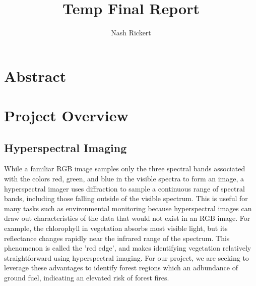 \documentclass{article}
\title{Temp Final Report}
\author{Nash Rickert}
\begin{document}
\maketitle

\section{Abstract}

\section{Project Overview}
\subsection{Hyperspectral Imaging}
While a familiar RGB image samples only the three spectral bands associated with the colors red, green, and blue in the visible spectra to form an image, a hyperspectral imager uses diffraction to sample a continuous range of spectral bands, including those falling outside of the visible spectrum. This is useful for many tasks such as environmental monitoring because hyperspectral images can draw out characteristics of the data that would not exist in an RGB image. For example, the chlorophyll in vegetation absorbs most visible light, but its reflectance changes rapidly near the infrared range of the spectrum. This phenomenon is called the 'red edge', and makes identifying vegetation relatively straightforward using hyperspectral imaging. For our project, we are seeking to leverage these advantages to identify forest regions which an adbundance of ground fuel, indicating an elevated risk of forest fires.
\end{document}
